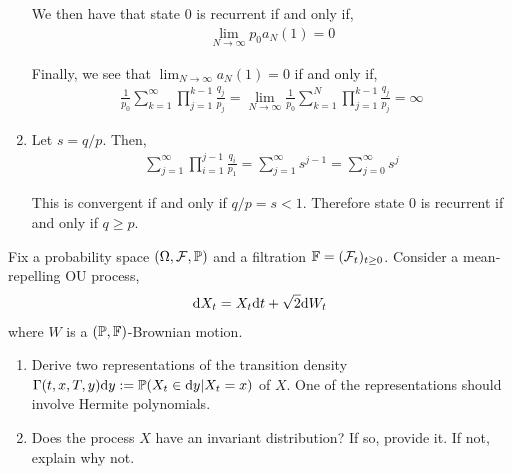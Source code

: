 \begin{solution}[Solution]
\begin{enumerate}[label=(\alph*)]
        We then have that state 0 is recurrent if and only if,
        \begin{align*}
            \lim_{N\to\infty} p_0a_N(1) = 0 
        \end{align*}
        
\iffalse
        Therefore state 0 is recurrent if and only if,
        \begin{align*}
            p_0 = 0 \text{ or } \lim_{N\to\infty} a_N(1) = 0
        \end{align*}
\fi
        Finally, we see that \( \lim_{N\to\infty} a_N(1) = 0 \) if and only if,
        \begin{align*}
            \frac{1}{p_0}\sum_{k=1}^\infty \prod_{j=1}^{k-1}\frac{q_j}{p_j}
            = \lim_{N\to\infty}\frac{1}{p_0}\sum_{k=1}^N \prod_{j=1}^{k-1}\frac{q_j}{p_j}
            = \infty
        \end{align*}

    
    \item
        Let \( s = q/p \). Then,
        \begin{align*}
            \sum_{j=1}^{\infty} \prod_{i=1}^{j-1} \frac{q_i}{p_1} = \sum_{j=1}^{\infty} s^{j-1} = \sum_{j=0}^{\infty} s^j
        \end{align*}
        
        This is convergent if and only if \( q/p = s < 1 \). Therefore state 0 is recurrent if and only if \( q \geq p \).


\end{enumerate}
\end{solution}


\begin{problem}
    Fix a probability space \( (\Omega,\mathcal{F},\mathbb{P}) \) and a filtration \( \mathbb{F} = (\mathcal{F}_t)_{t\geq 0} \). Consider a mean-repelling OU process,
    \begin{align*}
        \mathrm{d} X_t = X_t\mathrm{d} t + \sqrt{2} \mathrm{d} W_t
    \end{align*}
    where \( W \) is a \( (\mathbb{P},\mathbb{F}) \)-Brownian motion.
\begin{enumerate}[nolistsep,label=(\alph*)]
    \item Derive two representations of the transition density \( \Gamma(t,x,T,y)\mathrm{d} y := \mathbb{P}(X_t \in\mathrm{d} y | X_t = x) \) of \( X \). One of the representations should involve Hermite polynomials.
    \item Does the process \( X \) have an invariant distribution? If so, provide it. If not, explain why not.
\end{enumerate}
\end{problem}

